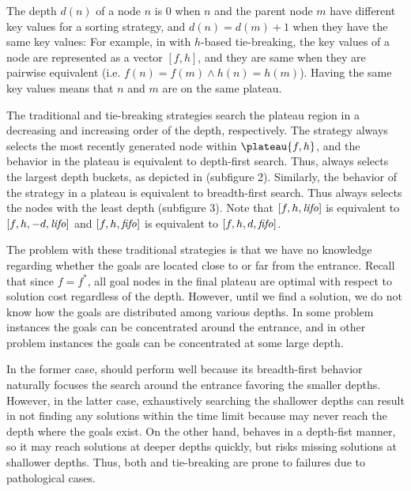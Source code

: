 The depth $d(n)$ of a
node $n$ is 0 when $n$ and the parent node $m$ have different key
values for a sorting strategy, and $d(n)=d(m)+1$ when they have the same
key values: For example, in \astar with $h$-based tie-breaking, the key
values of a node are represented as a vector $[f,h]$, and they are same
when they are pairwise equivalent (i.e. $f(n) = f(m) \land h(n) =
h(m)$).  Having the same key values means that $n$ and $m$ are on the
same plateau.

The traditional \lifo and \fifo tie-breaking strategies
search the plateau region in a decreasing and increasing order of the depth, respectively.
The \lifo strategy always selects the most recently generated node
within $\plateau{f,h}$, and the behavior in the plateau is equivalent to depth-first search.
Thus, \lifo always selects the largest depth
buckets, as depicted in  (subfigure 2).
Similarly, the behavior of the \fifo strategy 
in a plateau is equivalent to breadth-first search. Thus \fifo 
always selects the nodes with the least depth (subfigure 3).
Note that  $[f,h,{\text{\textit{lifo}}}]$ is equivalent to $[f,h,-d,{\text{\textit{lifo}}}]$ and
$[f,h,{\text{\textit{fifo}}}]$ is equivalent to $[f,h,d,{\text{\textit{fifo}}}]$.

The problem with these traditional strategies is that we have no knowledge
regarding whether the goals are located close to or far from the entrance. Recall
that since $f=f^*$, all goal nodes in the final plateau are optimal with respect to solution cost
regardless of the depth.
However, until we find a
solution, we do not know how the goals are distributed among various
depths. In some problem instances the goals can be concentrated around
the entrance, and in other problem instances the goals can be
concentrated at some large depth. %

In the former case, \fifo
should perform well because its breadth-first behavior naturally
focuses the search around the entrance favoring the smaller depths.
However, in the latter case, exhaustively searching
the shallower depths can result in not finding any solutions within
the time limit because \fifo may never reach the depth where the goals
exist.  On the other hand, \lifo behaves in a depth-fist manner, so it
may reach solutions at deeper depths quickly, but risks missing
solutions at shallower depths.  Thus, both \fifo and \lifo tie-breaking
are prone to failures due to pathological cases.

